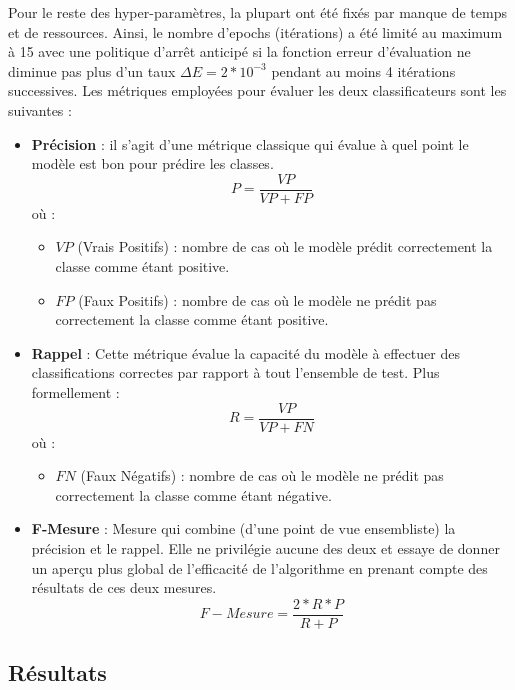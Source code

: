 	\par
	Pour le reste des hyper-paramètres, la plupart ont été fixés par manque de temps et de ressources. Ainsi, le nombre d'epochs (itérations) a été limité au maximum à 15 avec une politique d'arrêt anticipé si la fonction erreur d'évaluation ne diminue pas plus d'un taux $\Delta E = 2*10^{-3}$ pendant au moins 4 itérations successives. Les métriques employées pour évaluer les deux classificateurs sont les suivantes : 
	\begin{itemize}
		\item \textbf{Précision} : il s'agit d'une métrique classique qui évalue à quel point le modèle est bon pour prédire les classes.
		\begin{equation*}
			P = \frac{VP}{VP+FP}
		\end{equation*}
		où : 
		\begin{itemize}
			\item $VP$ (Vrais Positifs) : nombre de cas où le modèle prédit correctement la classe comme étant positive.
			\item $FP$ (Faux Positifs) : nombre de cas où le modèle ne prédit pas correctement la classe comme étant positive.
		\end{itemize}

		\item \textbf{Rappel} : Cette métrique évalue la capacité du modèle à effectuer des classifications correctes par rapport à tout l'ensemble de test. Plus formellement : 
		\begin{equation*}
		R = \frac{VP}{VP+FN}
		\end{equation*}
		où : 
		\begin{itemize}
			\item $FN$ (Faux Négatifs) : nombre de cas où le modèle ne prédit pas correctement la classe comme étant négative.
		\end{itemize}
	
		\item \textbf{F-Mesure} : Mesure qui combine (d'une point de vue ensembliste) la précision et le rappel. Elle ne privilégie aucune des deux et essaye de donner un aperçu plus global de l'efficacité de l'algorithme en prenant compte des résultats de ces deux mesures.
		\begin{equation*}
		F-Mesure = \frac{2*R*P}{R+P}
		\end{equation*}
	\end{itemize}
	\subsection{Résultats}
